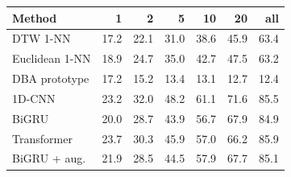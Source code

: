 \begin{tabular}{lrrrrrr}
\toprule
Method & 1 & 2 & 5 & 10 & 20 & all \\
\midrule
DTW 1-NN & 17.2 & 22.1 & 31.0 & 38.6 & 45.9 & 63.4 \\
Euclidean 1-NN & 18.9 & 24.7 & 35.0 & 42.7 & 47.5 & 63.2 \\
DBA prototype & 17.2 & 15.2 & 13.4 & 13.1 & 12.7 & 12.4 \\
1D-CNN & 23.2 & 32.0 & 48.2 & 61.1 & 71.6 & 85.5 \\
BiGRU & 20.0 & 28.7 & 43.9 & 56.7 & 67.9 & 84.9 \\
Transformer & 23.7 & 30.3 & 45.9 & 57.0 & 66.2 & 85.9 \\
BiGRU + aug. & 21.9 & 28.5 & 44.5 & 57.9 & 67.7 & 85.1 \\
\bottomrule
\end{tabular}

